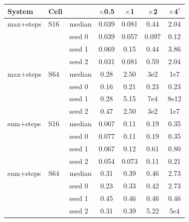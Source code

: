 \begin{tabular}{lllcccc}\toprule
 System & Cell & & $\times$0.5 & $\times$1 & $\times$2 & $\times$4$^\dagger$ \\\midrule
max+steps & S16 & median & 0.039 & 0.081 & 0.44 & 2.04 \\
 & & seed 0 & 0.039 & 0.057 & 0.097 & 0.12 \\
 & & seed 1 & 0.069 & 0.15 & 0.44 & 3.86 \\
 & & seed 2 & 0.031 & 0.081 & 0.59 & 2.04 \\
\midrule
max+steps & S64 & median & 0.28 & 2.50 & 3e2 & 1e7 \\
 & & seed 0 & 0.16 & 0.21 & 0.23 & 0.23 \\
 & & seed 1 & 0.28 & 5.15 & 7e4 & 8e12 \\
 & & seed 2 & 0.47 & 2.50 & 3e2 & 1e7 \\
\midrule
sum+steps & S16 & median & 0.067 & 0.11 & 0.19 & 0.35 \\
 & & seed 0 & 0.077 & 0.11 & 0.19 & 0.35 \\
 & & seed 1 & 0.067 & 0.12 & 0.61 & 0.80 \\
 & & seed 2 & 0.054 & 0.073 & 0.11 & 0.21 \\
\midrule
sum+steps & S64 & median & 0.31 & 0.39 & 0.46 & 2.73 \\
 & & seed 0 & 0.23 & 0.33 & 0.42 & 2.73 \\
 & & seed 1 & 0.45 & 0.46 & 0.46 & 0.46 \\
 & & seed 2 & 0.31 & 0.39 & 5.22 & 5e4 \\
\bottomrule\end{tabular}
